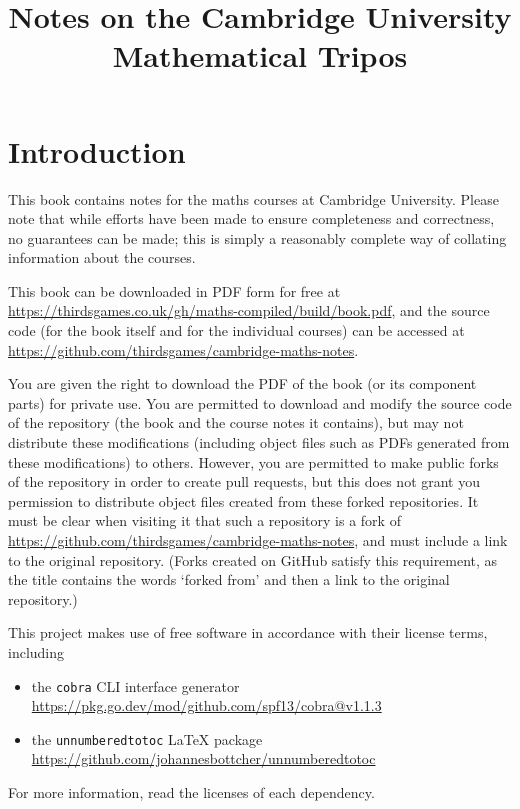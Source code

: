 \documentclass{book}
\title{Notes on the Cambridge University Mathematical Tripos}
\author{}
\begin{document}
\maketitle

\tableofcontents
\newpage

\chapter*{Introduction}
This book contains notes for the maths courses at Cambridge University.
Please note that while efforts have been made to ensure completeness and correctness, no guarantees can be made; this is simply a reasonably complete way of collating information about the courses.

This book can be downloaded in PDF form for free at \url{https://thirdsgames.co.uk/gh/maths-compiled/build/book.pdf}, and the source code (for the book itself and for the individual courses) can be accessed at \url{https://github.com/thirdsgames/cambridge-maths-notes}.

You are given the right to download the PDF of the book (or its component parts) for private use.
You are permitted to download and modify the source code of the repository (the book and the course notes it contains), but may not distribute these modifications (including object files such as PDFs generated from these modifications) to others.
However, you are permitted to make public forks of the repository in order to create pull requests, but this does not grant you permission to distribute object files created from these forked repositories.
It must be clear when visiting it that such a repository is a fork of \url{https://github.com/thirdsgames/cambridge-maths-notes}, and must include a link to the original repository.
(Forks created on GitHub satisfy this requirement, as the title contains the words `forked from' and then a link to the original repository.)

This project makes use of free software in accordance with their license terms, including
\begin{itemize}
	\item the \texttt{cobra} CLI interface generator \\ \url{https://pkg.go.dev/mod/github.com/spf13/cobra@v1.1.3}
	\item the \texttt{unnumberedtotoc} LaTeX package \\ \url{https://github.com/johannesbottcher/unnumberedtotoc}
\end{itemize}
For more information, read the licenses of each dependency.
\end{document}
